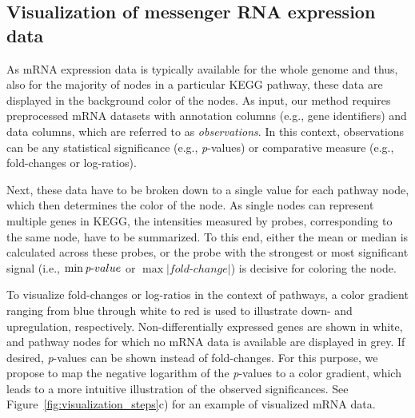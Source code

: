 \documentclass{bioinfo}
\begin{document}
\subsection{Visualization of messenger RNA expression data}

As mRNA expression data is typically available for the whole genome and thus, also for the majority
of nodes in a particular KEGG pathway, these data are displayed in the background color of the
nodes.
%
As input, our method requires preprocessed mRNA datasets with annotation columns (e.g.,
gene identifiers) and data columns, which are referred to as \emph{observations}. In this context,
observations can be any statistical significance (e.g., \emph{p}-values) or comparative measure
(e.g., fold-changes or log-ratios).

Next, these data have to be broken down to a single value for each pathway node, which then
determines the color of the node. As single nodes can represent multiple genes in KEGG, the
intensities measured by probes, corresponding to the same node, have to be summarized. To this end,
either the mean or median is calculated across these probes, or the probe
with the strongest or most significant signal (i.e., $\min\emph{p}\text{-}value$ or $\max|fold\text{-}change|$) is
decisive for coloring the node.

To visualize fold-changes or log-ratios in the context of pathways, a color gradient ranging from
blue through white to red is used to illustrate down- and upregulation,
respectively. Non-differentially expressed genes are shown in white, and pathway nodes for which no
mRNA data is available are displayed in grey. If desired, \emph{p}-values can be shown instead of
fold-changes. For this purpose, we propose to map the negative logarithm of the \emph{p}-values to a
color gradient, which leads to a more intuitive illustration of the observed significances. See
Figure~\ref{fig:visualization_steps}c) for an example of visualized mRNA data.

\end{document}
